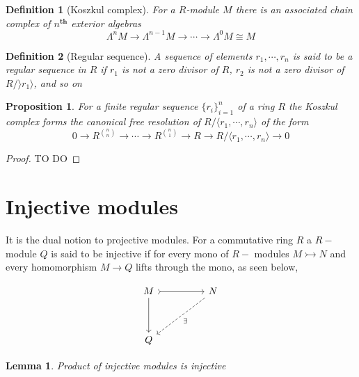 \documentclass[12pt]{article}
\numberwithin{equation}{section}
\newtheorem{definition}{Definition}[section]
\newtheorem{lemma}[theorem]{Lemma}
\newtheorem{proposition}{Proposition}[section]
\begin{document}
	
	\begin{definition}[Koszkul complex]
		For a $R$-module $M$ there is an associated chain complex of $n^\textbf{th}$ exterior algebras
		\[ \Lambda^n M \to \Lambda^{n-1} M \to \cdots \to \Lambda^0 M \cong M \]
	\end{definition}
	
	
	\begin{definition}[Regular sequence]
		A sequence of elements $r_1,\cdots,r_n$ is said to be a regular sequence in $R$ if $r_1$ is not a zero divisor of $R$, $r_2$ is not a zero divisor of $R/\rangle r_1\rangle $, and so on
	\end{definition}
	\begin{proposition}
		For a finite regular sequence $\{r_i\}_{i=1}^n$ of a ring $R$ the Koszkul complex forms the canonical free resolution of $R/\langle r_1,\cdots,r_n\rangle$ of the form
			\[ 0 \to R^{\binom{n}{n}} \to \cdots \to R^{\binom{n}{1}} \to R \to R/\langle r_1,\cdots, r_n \rangle \to 0\]
	\end{proposition}
	\begin{proof}
		TO DO
	\end{proof}
	
	\section{Injective modules}
	It is the dual notion to projective modules. For a commutative ring $R$ a $R-$module $Q$ is said to be injective if for every mono of $R-$ modules $M \rightarrowtail N$ and every homomorphism $ M \to Q$ lifts through the mono, as seen below,
		
	\[\begin{tikzcd}
		M && N \\
		\\
		Q
		\arrow[ tail, from=1-1, to=1-3]
		\arrow[ from=1-1, to=3-1]
		\arrow["{\exists}", dashed, from=1-3, to=3-1]
	\end{tikzcd}\]
	
	\begin{lemma}
		Product of injective modules is injective
	\end{lemma}
	
\end{document}
